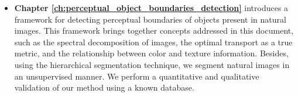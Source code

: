 \begin{itemize}
	\item \textbf{Chapter \ref{ch:perceptual_object_boundaries_detection}} introduces a framework for detecting perceptual boundaries of objects present in natural images. This framework brings together concepts addressed in this document, such as the spectral decomposition of images, the optimal transport as a true metric, and the relationship between color and texture information. Besides, using the hierarchical segmentation technique, we segment natural images in an unsupervised manner. We perform a quantitative and qualitative validation of our method using a known database.
	
	
\end{itemize}

